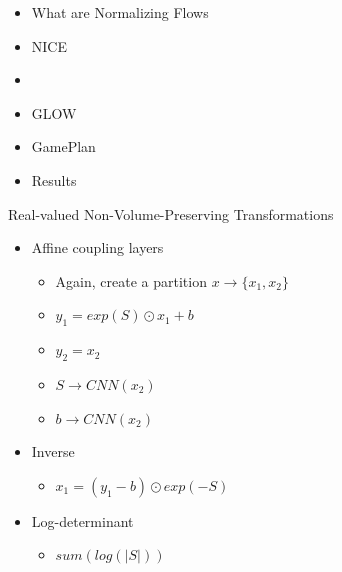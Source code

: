 \begin{frame}
\begin{itemize}
    \item What are Normalizing Flows
    \item NICE
    \item \textbf{\color{red}{RealNVP}}
    \item GLOW
    \item GamePlan
    \item Results
\end{itemize}
\end{frame}

\begin{frame}{Real-valued Non-Volume-Preserving Transformations}
\begin{itemize}
    \item Affine coupling layers
    \begin{itemize}
        \item Again, create a partition $x \longrightarrow \{x_1, x_2\} $
        \item $y_1 = exp(S) \odot x_1 + b$
        \item $y_2 = x_2$
        \item $S \longrightarrow CNN(x_2)$
        \item $b \longrightarrow CNN(x_2)$
    \end{itemize}
    \item Inverse
        \begin{itemize}
            \item $x_1 = (y_1 - b) \odot exp(-S)$
        \end{itemize}
    \item Log-determinant
        \begin{itemize}
            \item $sum(log(|S|))$
        \end{itemize}
\end{itemize}

\end{frame}

